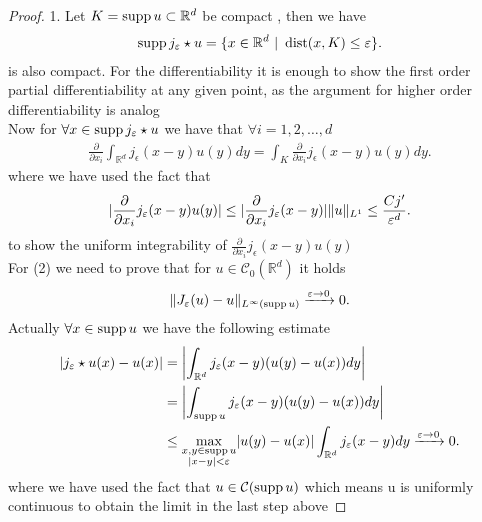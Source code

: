 \begin{proof}
 1. Let $K = \supp u \subset  \mathbb{R}^{d} $ be compact , then we have 
 \begin{align*}
   \supp j_{\epsilon} \star  u = \{x \in  \mathbb{R}^{d} \ | \ \dist(x,K) \le \epsilon  \}  
 .\end{align*}
 is also compact. For the differentiability  it is enough to show the first order partial 
 differentiability at any given point, as the argument for higher order differentiability is analog\\[1ex]
 Now for $\forall  x \in  \supp j_{\epsilon} \star  u$  we have that $\forall i = 1,2,\ldots ,d$ 
 \begin{align*}
   \frac{\partial }{\partial x_i}  \int_{\mathbb{R}^{d} } j_{\epsilon}(x-y)u(y) dy = \int_K \frac{\partial }{\partial x_i} j_{\epsilon}(x-y)u(y) dy
 .\end{align*}
 where we have used the fact that 
 \begin{align*}
   \abs{\frac{\partial }{\partial x_i} j_{\epsilon}(x-y)u(y)} \le \abs{\frac{\partial }{\partial x_i}j_{\epsilon}(x-y) } \|u\|_{L^{1} } \le  \frac{Cj'}{\epsilon ^{d} }
 .\end{align*}
 to show the uniform integrability of $\frac{\partial }{\partial x_i}j_{\epsilon}(x-y)u(y) $\\[1ex]
 For (2) we need to prove that for $u \in  \mathcal{C}_0(\mathbb{R}^{d} )$ it holds 
 \begin{align*}
   \|J_{\epsilon}(u)-u\|_{L^{\infty}(\supp u) } \xrightarrow{\epsilon \to 0} 0
 .\end{align*}
 Actually $\forall  x \in \supp u$ we have the following estimate
 \begin{align*}
   \abs{j_{\epsilon}\star u(x) - u(x)} &= \abs*{\int_{\mathbb{R}^{d} }j_{\epsilon}(x-y)(u(y)-u(x)) dy}\\
                                       &= \abs*{\int_{\supp u} j_{\epsilon}(x-y)(u(y)-u(x)) dy}\\
                                       &\le \max_{\substack{x,y \in \supp u \\ \abs{x-y} < \epsilon}} \abs{u(y)-u(x)} \int_{\mathbb{R}^{d} }j_{\epsilon}(x-y)dy \xrightarrow{\epsilon \to 0} 0
 .\end{align*}
 where we have used the fact that $u \in  \mathcal{C}(\supp u)$ which means u is uniformly continuous to obtain the limit in the last step above
\end{proof}
